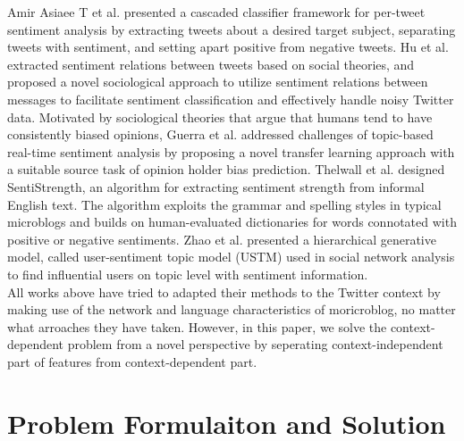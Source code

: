 \documentclass{llncs}
\begin{document}
Amir Asiaee T et al.\cite{AsiaeeT:2012} presented a cascaded classifier framework for per-tweet sentiment analysis by extracting tweets about a desired target subject, separating tweets with sentiment, and  setting apart positive from negative tweets.
Hu et al.\cite{Hu:2013ESR} extracted sentiment relations between tweets based on social theories, and proposed a novel sociological approach to utilize sentiment relations between messages to facilitate sentiment classification and effectively handle noisy Twitter data.
Motivated by sociological theories that argue that humans tend to have consistently biased opinions, Guerra et al.\cite{CalaisGuerra:2011BOT} addressed challenges of topic-based real-time sentiment analysis by proposing a novel transfer learning approach with a suitable source task of opinion holder bias prediction.
Thelwall et al.\cite{Thelwall:2010SSS,Thelwall:2012SSD} designed SentiStrength, an algorithm for extracting sentiment strength from informal English text. The algorithm exploits the grammar and spelling styles in typical microblogs and builds on human-evaluated dictionaries for words connotated with positive or negative sentiments.
Zhao et al.\cite{Zhao:2012UTM} presented a hierarchical generative model, called user-sentiment topic model (USTM) used in social network analysis to find influential users on topic level with sentiment information.\\
All works above have tried to adapted their methods to the Twitter context by making use of the network and language characteristics of moricroblog, no matter what arroaches they have taken. However, in this paper, we solve the context-dependent problem from a novel perspective by seperating context-independent part of features from context-dependent part.
\section{Problem Formulaiton and Solution}
\end{document}
